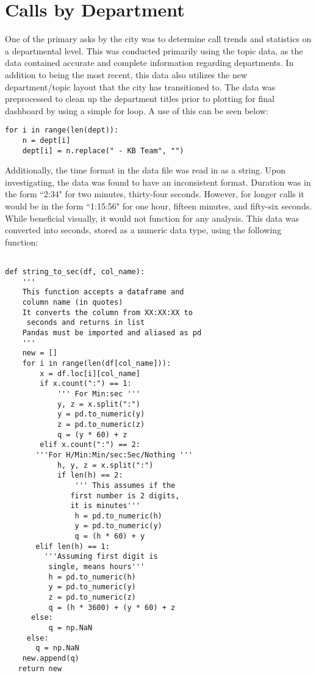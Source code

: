 \documentclass[11pt,twocolumn]{article}
\begin{document}
\section{Calls by Department}
One of the primary asks by the city was to determine call trends and statistics on a departmental level.  This was conducted primarily using the topic data, as the data contained accurate and complete information regarding departments.  In addition to being the most recent, this data also utilizes the new department/topic layout that the city has transitioned to.  The data was preprocessed to clean up the department titles prior to plotting for final dashboard by using a simple for loop.  A use of this can be seen below:\\

  \begin{Verbatim}[fontsize=\small]
  for i in range(len(dept)):
    n = dept[i]
    dept[i] = n.replace(" - KB Team", "")
  \end{Verbatim}


Additionally, the time format in the data file was read in as a string.  Upon investigating, the data was found to have an inconsistent format.  Duration was in the form ``2:34" for two minutes, thirty-four seconds.  However, for longer calls it would be in the form ``1:15:56" for one hour, fifteen minutes, and fifty-six seconds.  While beneficial visually, it would not function for any analysis.  This data was converted into seconds, stored as a numeric data type, using the following function:

  \begin{Verbatim}[fontsize=\small]
  
def string_to_sec(df, col_name):
    ''' 
    This function accepts a dataframe and 
    column name (in quotes)
    It converts the column from XX:XX:XX to
     seconds and returns in list
    Pandas must be imported and aliased as pd
    '''
    new = []
    for i in range(len(df[col_name])):
        x = df.loc[i][col_name]
        if x.count(":") == 1:
            ''' For Min:sec '''
            y, z = x.split(":")
            y = pd.to_numeric(y)
            z = pd.to_numeric(z)
            q = (y * 60) + z
        elif x.count(":") == 2:
       '''For H/Min:Min/sec:Sec/Nothing '''
            h, y, z = x.split(":")
            if len(h) == 2:
                ''' This assumes if the
               first number is 2 digits,
               it is minutes'''
                h = pd.to_numeric(h)
                y = pd.to_numeric(y)
                q = (h * 60) + y
       elif len(h) == 1:
         '''Assuming first digit is 
          single, means hours'''
          h = pd.to_numeric(h)
          y = pd.to_numeric(y)
          z = pd.to_numeric(z)
          q = (h * 3600) + (y * 60) + z
      else:
          q = np.NaN
     else:
       q = np.NaN
    new.append(q)
   return new
  \end{Verbatim}
\end{document}
